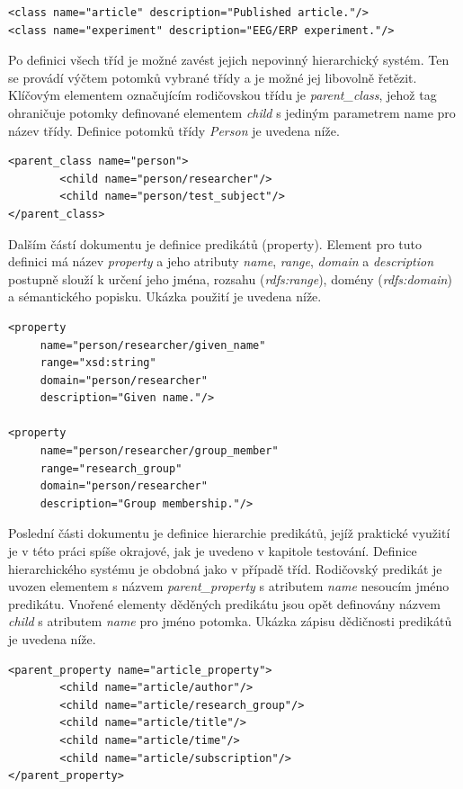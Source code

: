 \documentclass{projekt}
\begin{document}
\begin{verbatim}
<class name="article" description="Published article."/>    
<class name="experiment" description="EEG/ERP experiment."/>
\end{verbatim}

Po definici všech tříd je možné zavést jejich nepovinný hierarchický systém. Ten se provádí výčtem potomků vybrané třídy a je možné jej libovolně řetězit. Klíčovým elementem označujícím rodičovskou třídu je {\it parent\_class}, jehož tag ohraničuje potomky definované elementem {\it child} s jediným parametrem name pro název třídy. Definice potomků třídy {\it Person} je uvedena níže.

\begin{verbatim}
<parent_class name="person">
        <child name="person/researcher"/>
        <child name="person/test_subject"/>
</parent_class>
\end{verbatim}

Dalším částí dokumentu je definice predikátů (property). Element pro tuto definici má název {\it property} a jeho atributy {\it name}, {\it range}, {\it domain} a {\it description} postupně slouží k určení jeho jména, rozsahu ({\it rdfs:range}), domény ({\it rdfs:domain}) a sémantického popisku. Ukázka použití je uvedena níže.

\begin{verbatim}
<property 
     name="person/researcher/given_name" 
     range="xsd:string" 
     domain="person/researcher" 
     description="Given name."/>

<property 
     name="person/researcher/group_member" 
     range="research_group" 
     domain="person/researcher" 
     description="Group membership."/>
\end{verbatim}

Poslední části dokumentu je definice hierarchie predikátů, jejíž praktické využití je v této práci spíše okrajové, jak je uvedeno v kapitole testování. Definice hierarchického systému je obdobná jako v případě tříd. Rodičovský predikát je uvozen elementem s názvem {\it parent\_property} s atributem {\it name} nesoucím jméno predikátu. Vnořené elementy děděných predikátu jsou opět definovány názvem {\it child} s atributem {\it name} pro jméno potomka. Ukázka zápisu dědičnosti predikátů je uvedena níže.

\begin{verbatim}
<parent_property name="article_property">
        <child name="article/author"/>
        <child name="article/research_group"/>
        <child name="article/title"/>
        <child name="article/time"/>
        <child name="article/subscription"/>
</parent_property>
\end{verbatim}
\end{document}
